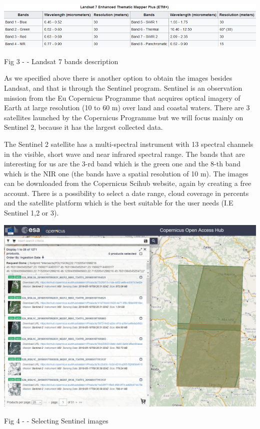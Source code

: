 \documentclass[12pt, a4paper]{report}
\begin{document}
\includegraphics[scale=0.73, center]{Capture.png} 
\begin{center}
Fig 3 - \cite{Wiki_landsat} - Landsat 7 bands description
\end{center}


\medskip

As we specified above there is another option to obtain the images besides Landsat, and that is through the Sentinel program. Sentinel is an observation mission from the Eu Copernicus Programme that acquires optical imagery of Earth at large resolution (10 to 60 m) over land and coastal waters. There are 3 satellites launched by the Copernicus Programme but we will focus mainly on Sentinel 2, because it has the largest collected data. 
\par 

The Sentinel 2 satellite has a multi-spectral instrument with 13 spectral channels in the visible, short wave and near infrared spectral range. The bands that are interesting for us are the 3-rd band which is the green one and the 8-th band which is the NIR one (the bands have a spatial resolution of 10 m). The images  can be downloaded from the Copernicus Scihub website, again by creating a free account. There is a possibility to select a date range, cloud coverage in percents and the satellite platform which is the best suitable for the user needs (I.E Sentinel 1,2 or 3). 
\par 

\bigskip

\includegraphics[scale=0.54, center]{sentinel.png} 
\begin{center}
Fig 4 - \cite{Copernicus} - Selecting Sentinel images
\end{center}
\par 
\end{document}
